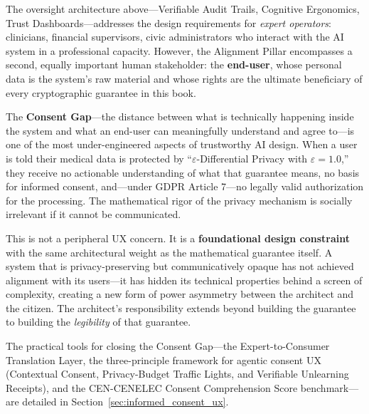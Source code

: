 The oversight architecture above---Verifiable Audit Trails, Cognitive Ergonomics, Trust Dashboards---addresses the design requirements for \emph{expert operators}: clinicians, financial supervisors, civic administrators who interact with the AI system in a professional capacity. However, the Alignment Pillar encompasses a second, equally important human stakeholder: the \textbf{end-user}, whose personal data is the system's raw material and whose rights are the ultimate beneficiary of every cryptographic guarantee in this book.

The \textbf{Consent Gap}---the distance between what is technically happening inside the system and what an end-user can meaningfully understand and agree to---is one of the most under-engineered aspects of trustworthy AI design. When a user is told their medical data is protected by ``$\varepsilon$-Differential Privacy with $\varepsilon=1.0$,'' they receive no actionable understanding of what that guarantee means, no basis for informed consent, and---under GDPR Article 7---no legally valid authorization for the processing. The mathematical rigor of the privacy mechanism is socially irrelevant if it cannot be communicated.

This is not a peripheral UX concern. It is a \textbf{foundational design constraint} with the same architectural weight as the mathematical guarantee itself. A system that is privacy-preserving but communicatively opaque has not achieved alignment with its users---it has hidden its technical properties behind a screen of complexity, creating a new form of power asymmetry between the architect and the citizen. The architect's responsibility extends beyond building the guarantee to building the \emph{legibility} of that guarantee.

The practical tools for closing the Consent Gap---the Expert-to-Consumer Translation Layer, the three-principle framework for agentic consent UX (Contextual Consent, Privacy-Budget Traffic Lights, and Verifiable Unlearning Receipts), and the CEN-CENELEC Consent Comprehension Score benchmark---are detailed in Section~\ref{sec:informed_consent_ux}.



